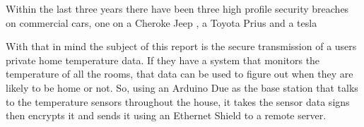 Within the last three years there have been three high profile security breaches on commercial cars, one on a Cheroke Jeep \cite{jeephack}, a Toyota Prius \cite{priushack} and a tesla \cite{teslahack}

With that in mind the subject of this report is the secure transmission of a users private home temperature data. If they have a system that monitors the temperature of all the rooms, that data can be used to figure out when they
are likely to be home or not. So, using an Arduino Due as the base station that talks to the temperature sensors throughout the house, it takes the sensor data signs then encrypts it and sends it using an Ethernet Shield to a remote
server. 